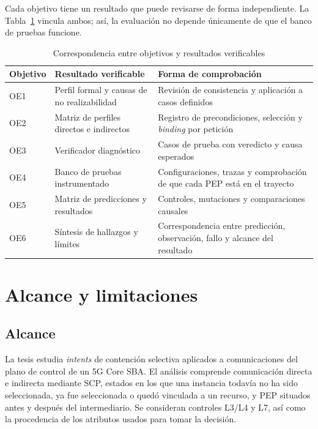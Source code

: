 Cada objetivo tiene un resultado que puede revisarse de forma independiente. La Tabla~\ref{tab:trazabilidad-objetivos-cap1} vincula ambos; así, la evaluación no depende únicamente de que el banco de pruebas funcione.

\begin{table}[H]
    \centering
    \caption{Correspondencia entre objetivos y resultados verificables}
    \label{tab:trazabilidad-objetivos-cap1}
    \footnotesize
    \begin{singlespace}
    \begin{tabularx}{\textwidth}{@{}
        >{\centering\arraybackslash}p{1.40cm}
        >{\raggedright\arraybackslash}p{4.90cm}
        >{\raggedright\arraybackslash}X@{}}
        \toprule
        Objetivo & Resultado verificable & Forma de comprobación \\
        \midrule
        OE1 & Perfil formal y causas de no realizabilidad & Revisión de consistencia y aplicación a casos definidos \\
        OE2 & Matriz de perfiles directos e indirectos & Registro de precondiciones, selección y \textit{binding} por petición \\
        OE3 & Verificador diagnóstico & Casos de prueba con veredicto y causa esperados \\
        OE4 & Banco de pruebas instrumentado & Configuraciones, trazas y comprobación de que cada PEP está en el trayecto \\
        OE5 & Matriz de predicciones y resultados & Controles, mutaciones y comparaciones causales \\
        OE6 & Síntesis de hallazgos y límites & Correspondencia entre predicción, observación, fallo y alcance del resultado \\
        \bottomrule
    \end{tabularx}
    \end{singlespace}
\end{table}

\section{Alcance y limitaciones}
\label{sec:alcance-limitaciones-cap1}

\subsection{Alcance}

La tesis estudia \textit{intents} de contención selectiva aplicados a comunicaciones del plano de control de un 5G Core SBA. El análisis comprende comunicación directa e indirecta mediante SCP, estados en los que una instancia todavía no ha sido seleccionada, ya fue seleccionada o quedó vinculada a un recurso, y PEP situados antes y después del intermediario. Se consideran controles L3/L4 y L7, así como la procedencia de los atributos usados para tomar la decisión.

